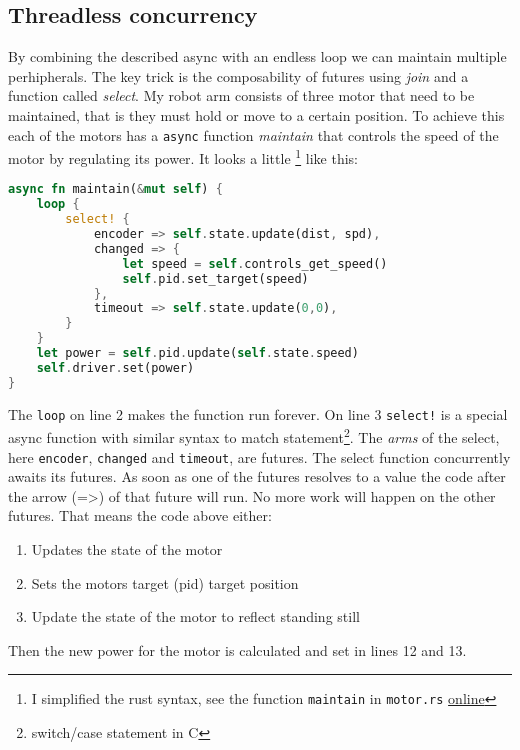\documentclass[lang=en, hanging-titles=true]{skrapport}
\begin{document}
\subsection{Threadless concurrency}
By combining the described async with an endless loop we can maintain multiple perhipherals. The key trick is the composability of futures using \textit{join} and a function called \textit{select}. My robot arm consists of three motor that need to be maintained, that is they must hold or move to a certain position. To achieve this each of the motors has a \texttt{async} function \textit{maintain} that controls the speed of the motor by regulating its power. It looks a little %
\footnote{I simplified the rust syntax, see the function \texttt{maintain} in \texttt{motor.rs} \href{https://github.com/dskleingeld/robotic-arm/blob/main/src/hinge/motor.rs}{online}} 
like this:

\begin{minipage}{\linewidth} %
\begin{lstlisting}[language=rust, style=boxed, tabsize=2]
async fn maintain(&mut self) {
	loop {
		select! {
			encoder => self.state.update(dist, spd),
			changed => {
				let speed = self.controls_get_speed()
				self.pid.set_target(speed)
			},
			timeout => self.state.update(0,0),
		}
	}
	let power = self.pid.update(self.state.speed)
	self.driver.set(power)
}
\end{lstlisting}
\end{minipage}

The \texttt{loop} on line 2 makes the function run forever. On line 3 \texttt{select!} is a special async function with similar syntax to match statement\footnote{switch/case statement in C}. The \textit{arms} of the select, here \texttt{encoder}, \texttt{changed} and \texttt{timeout}, are futures. The select function concurrently awaits its futures. As soon as one of the futures resolves to a value the code after the arrow (=>) of that future will run. No more work will happen on the other futures. That means the code above either:
\begin{enumerate}
	\item Updates the state of the motor
	\item Sets the motors target (pid) target position
	\item Update the state of the motor to reflect standing still
\end{enumerate}
Then the new power for the motor is calculated and set in lines 12 and 13.
\end{document}
